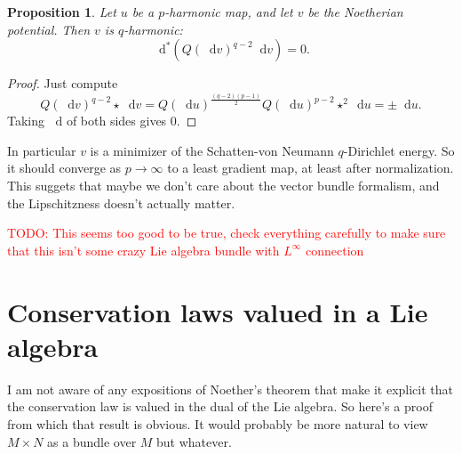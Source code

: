 \documentclass[reqno,11pt]{amsart}
\newcommand*\dif{\mathop{}\!\mathrm{d}}
\newtheorem{proposition}[theorem]{Proposition}
\theoremstyle{definition}
\numberwithin{equation}{section}
\newcommand\todo[1]{\textcolor{red}{TODO: #1}}
\begin{document}
\begin{proposition}
Let $u$ be a $p$-harmonic map, and let $v$ be the Noetherian potential.
Then $v$ is $q$-harmonic:
$$\dif^* (Q(\dif v)^{q - 2} \dif v) = 0.$$
\end{proposition}
\begin{proof}
Just compute 
$$Q(\dif v)^{q - 2} \star \dif v = Q(\dif u)^{\frac{(q - 2)(p - 1)}{2}} Q(\dif u)^{p - 2} \star^2 \dif u = \pm \dif u.$$
Taking $\dif$ of both sides gives $0$.
\end{proof}

In particular $v$ is a minimizer of the Schatten-von Neumann $q$-Dirichlet energy.
So it should converge as $p \to \infty$ to a least gradient map, at least after normalization. 
This suggets that maybe we don't care about the vector bundle formalism, and the Lipschitzness doesn't actually matter.

\todo{This seems too good to be true, check everything carefully to make sure that this isn't some crazy Lie algebra bundle with $L^\infty$ connection}

\appendix 
\section{Conservation laws valued in a Lie algebra}
I am not aware of any expositions of Noether's theorem that make it explicit that the conservation law is valued in the dual of the Lie algebra.
So here's a proof from which that result is obvious.
It would probably be more natural to view $M \times N$ as a bundle over $M$ but whatever.
\end{document}
